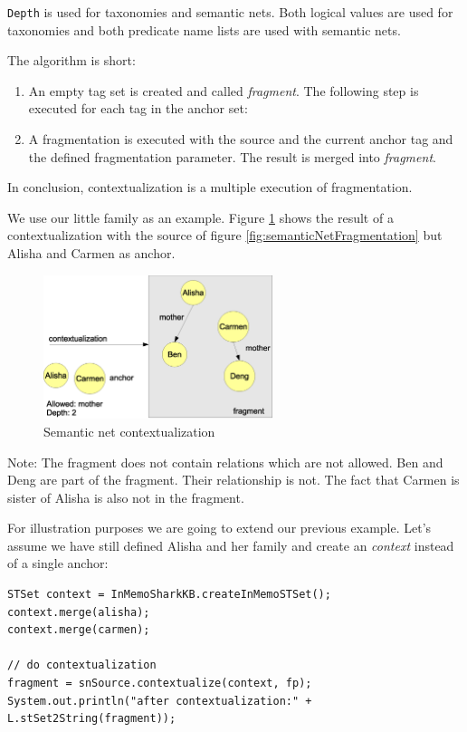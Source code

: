 {\tt Depth} is used for taxonomies and semantic nets. Both logical values are used for taxonomies and both predicate name lists are used with semantic nets.

The algorithm is short:

\begin{enumerate}

    \item
An empty tag set is created and called {\it fragment}.
The following step is executed for each tag in the anchor set:

\item
A fragmentation is executed with the source and the current anchor tag and the defined fragmentation parameter. The result is merged into {\it fragment}.

\end{enumerate}
In conclusion, contextualization is a multiple execution of fragmentation.

We use our little family as an example. Figure \ref{fig:semanticnetContextualization} shows the result of a contextualization with the source of figure \ref{fig:semanticNetFragmentation} but Alisha and Carmen as anchor.

\begin{figure}[t]
\centering
\includegraphics[width=0.60\textwidth]{semanticnetContextualization.eps}
\caption{Semantic net contextualization}
\label{fig:semanticnetContextualization}
\end{figure}

Note: The fragment does not contain relations which are not allowed.
Ben and Deng are part of the fragment. Their relationship is not.
The fact that Carmen is sister of Alisha is also not in the fragment.

For illustration purposes we are going to extend our previous example.
Let's assume we have still defined Alisha and her family and create an
{\it context} instead of a single anchor:

\begin{verbatim}
STSet context = InMemoSharkKB.createInMemoSTSet();
context.merge(alisha);
context.merge(carmen);

// do contextualization
fragment = snSource.contextualize(context, fp);
System.out.println("after contextualization:" + L.stSet2String(fragment));
\end{verbatim}

